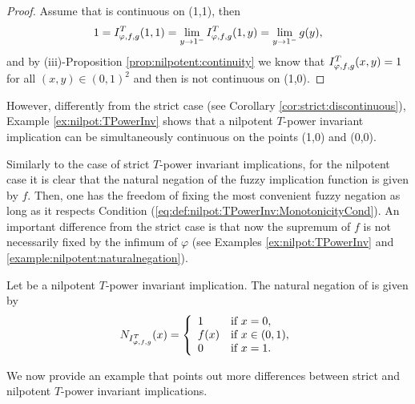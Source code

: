 \begin{proof}
	Assume that \IT is continuous on (1,1), then
	$$1=I^T_{\varphi,f,g}(1,1)=\lim_{y \to 1^-} I^T_{\varphi,f,g}(1,y)=\lim_{y \to 1^-} g(y),$$
	and by (iii)-Proposition \ref{prop:nilpotent:continuity} we know that $I^T_{\varphi,f,g}(x,y)=1$ for all $(x,y) \in (0,1)^2$ and then \IT is not continuous on (1,0).
\end{proof}

However, differently from the strict case (see Corollary \ref{cor:strict:discontinuous}), Example \ref{ex:nilpot:TPowerInv} shows that a nilpotent $T$-power invariant implication can be simultaneously continuous on the points (1,0) and (0,0).

Similarly to the case of strict $T$-power invariant implications, for the nilpotent case it is clear that the natural negation of the fuzzy implication function is given by $f$. Then, one has the freedom of fixing the most convenient fuzzy negation as long as it respects Condition (\ref{eq:def:nilpot:TPowerInv:MonotonicityCond}). An important difference from the strict case is that now the supremum of $f$ is not necessarily fixed by the infimum of $\varphi$ (see Examples \ref{ex:nilpot:TPowerInv} and \ref{example:nilpotent:naturalnegation}).
\begin{proposition}\label{cor:nilpotent:natural_negation}
	Let \IT be a nilpotent $T$-power invariant implication. The natural negation of \IT is given by
	$$
	N_{I^T_{\varphi,f,g}}(x)= \left\{ \begin{array}{ll}
		1 &   \text{if }   x=0, \\
		f(x) &   \text{if }   x \in (0,1), \\
		0 &  \text{if }   x=1. 	\end{array}
	\right.
	$$ 
\end{proposition}

We now provide an example that points out more differences between strict and nilpotent $T$-power invariant implications.


